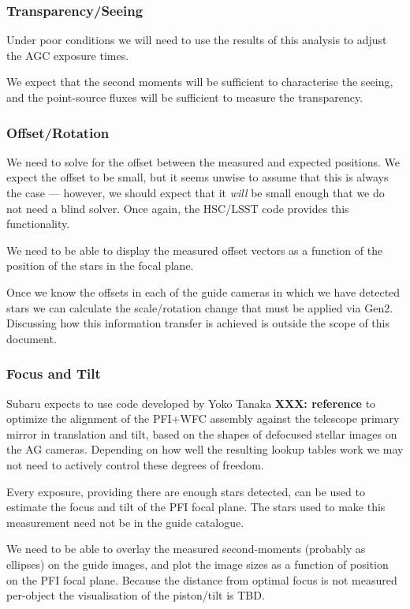 \documentclass[12pt]{article}
\newcommand{\AGC}{\gls{AGC}\xspace}
\newcommand{\PFI}{\gls{PFI}\xspace}
\newcommand{\TBD}{\gls{TBD}\xspace}
\newcommand{\XXX}[1]{\textbf{XXX: #1}}
\begin{document}
\subsubsection{Transparency/Seeing}

Under poor conditions we will need to use the results of this analysis to adjust the \AGC exposure
times.

We expect that the second moments will be sufficient to characterise the seeing, and the point-source
fluxes will be sufficient to measure the transparency.

\subsubsection{Offset/Rotation}

We need to solve for the offset between the measured and expected positions.  We expect the offset
to be small, but it seems unwise to assume that this is always the case --- however, we should expect
that it \textit{will} be small enough that we do not need a blind solver.  Once again,
the \gls{HSC}/\gls{LSST} code provides this functionality.

We need to be able to display the measured offset vectors as a function of the position of the stars
in the focal plane.

Once we know the offsets in each of the guide cameras in which we have detected stars we can
calculate the scale/rotation change that must be applied via \gls{Gen2}.  Discussing how
this information transfer is achieved is outside the scope of this document.

\subsubsection{Focus and Tilt}

Subaru expects to use code developed by Yoko Tanaka \XXX{reference} to optimize the
alignment of the PFI+WFC assembly against the telescope primary mirror in translation and tilt, based on the
shapes of defocused stellar images on the AG cameras.  Depending on how well the resulting lookup
tables work we may not need to actively control these degrees of freedom.

Every exposure, providing there are enough stars detected, can be used to estimate the focus and tilt
of the \PFI focal plane.  The stars used to make this measurement need not be in the guide catalogue.

We need to be able to overlay the measured second-moments (probably as ellipses) on the guide images,
and plot the image sizes as a function of position on the \PFI focal plane.  Because the distance
from optimal focus
is not measured per-object the visualisation of the piston/tilt is \TBD.
\end{document}
